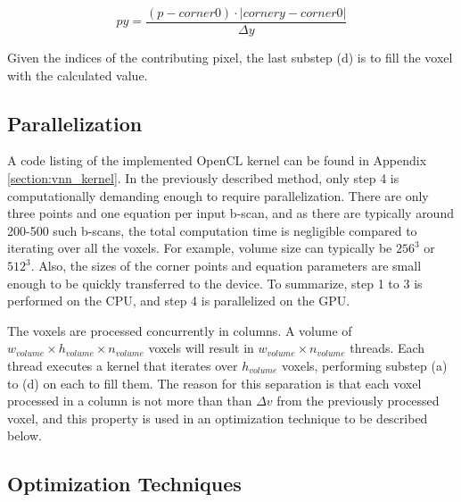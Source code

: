 \begin{equation}
\label{eq:pxy1}
	py = \frac{(p-corner0) \cdot |cornery-corner0|}{\Delta y}
\end{equation}

Given the indices of the contributing pixel, the last substep (d) is to fill the voxel with the calculated value.

\subsection{Parallelization}


A code listing of the implemented OpenCL kernel can be found in Appendix \ref{section:vnn_kernel}. In the previously described method, only step 4 is computationally demanding enough to require parallelization. There are only three points and one equation per input b-scan, and as there are typically around 200-500 such b-scans, the total computation time is negligible compared to iterating over all the voxels. For example, volume size can typically be $256^3$ or $512^3$. Also, the sizes of the corner points and equation parameters are small enough to be quickly transferred to the device. To summarize, step 1 to 3 is performed on the CPU, and step 4 is parallelized on the GPU.

The voxels are processed concurrently in columns. A volume of $w_{volume} \times h_{volume} \times n_{volume}$ voxels will result in $w_{volume} \times n_{volume}$ threads. Each thread executes a kernel that iterates over $h_{volume}$ voxels, performing substep (a) to (d) on each to fill them. The reason for this separation is that each voxel processed in a column is not more than than $\Delta v$ from the previously processed voxel, and this property is used in an optimization technique to be described below.

\subsection{Optimization Techniques}

		
